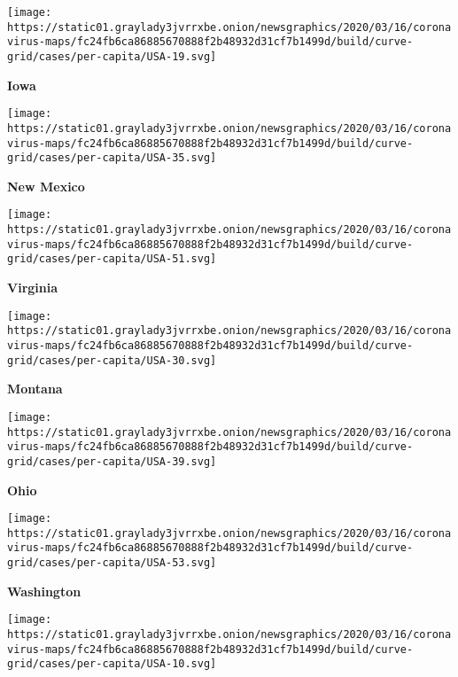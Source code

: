 \texttt{[image: https://static01.graylady3jvrrxbe.onion/newsgraphics/2020/03/16/coronavirus-maps/fc24fb6ca86885670888f2b48932d31cf7b1499d/build/curve-grid/cases/per-capita/USA-19.svg]}

\textbf{Iowa}

\href{https://www.nytimes3xbfgragh.onion/interactive/2020/us/new-mexico-coronavirus-cases.html}{}

\texttt{[image: https://static01.graylady3jvrrxbe.onion/newsgraphics/2020/03/16/coronavirus-maps/fc24fb6ca86885670888f2b48932d31cf7b1499d/build/curve-grid/cases/per-capita/USA-35.svg]}

\textbf{New Mexico}

\href{https://www.nytimes3xbfgragh.onion/interactive/2020/us/virginia-coronavirus-cases.html}{}

\texttt{[image: https://static01.graylady3jvrrxbe.onion/newsgraphics/2020/03/16/coronavirus-maps/fc24fb6ca86885670888f2b48932d31cf7b1499d/build/curve-grid/cases/per-capita/USA-51.svg]}

\textbf{Virginia}

\href{https://www.nytimes3xbfgragh.onion/interactive/2020/us/montana-coronavirus-cases.html}{}

\texttt{[image: https://static01.graylady3jvrrxbe.onion/newsgraphics/2020/03/16/coronavirus-maps/fc24fb6ca86885670888f2b48932d31cf7b1499d/build/curve-grid/cases/per-capita/USA-30.svg]}

\textbf{Montana}

\href{https://www.nytimes3xbfgragh.onion/interactive/2020/us/ohio-coronavirus-cases.html}{}

\texttt{[image: https://static01.graylady3jvrrxbe.onion/newsgraphics/2020/03/16/coronavirus-maps/fc24fb6ca86885670888f2b48932d31cf7b1499d/build/curve-grid/cases/per-capita/USA-39.svg]}

\textbf{Ohio}

\href{https://www.nytimes3xbfgragh.onion/interactive/2020/us/washington-coronavirus-cases.html}{}

\texttt{[image: https://static01.graylady3jvrrxbe.onion/newsgraphics/2020/03/16/coronavirus-maps/fc24fb6ca86885670888f2b48932d31cf7b1499d/build/curve-grid/cases/per-capita/USA-53.svg]}

\textbf{Washington}

\href{https://www.nytimes3xbfgragh.onion/interactive/2020/us/delaware-coronavirus-cases.html}{}

\texttt{[image: https://static01.graylady3jvrrxbe.onion/newsgraphics/2020/03/16/coronavirus-maps/fc24fb6ca86885670888f2b48932d31cf7b1499d/build/curve-grid/cases/per-capita/USA-10.svg]}

